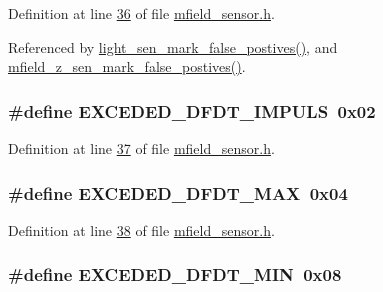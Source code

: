 Definition at line \hyperlink{a00019_source_l00036}{36} of file \hyperlink{a00019_source}{mfield\+\_\+sensor.\+h}.



Referenced by \hyperlink{a00047_source_l00491}{light\+\_\+sen\+\_\+mark\+\_\+false\+\_\+postives()}, and \hyperlink{a00053_source_l00747}{mfield\+\_\+z\+\_\+sen\+\_\+mark\+\_\+false\+\_\+postives()}.

\hypertarget{a00019_abf943c473e214930a7be647c4c43b55d}{
\subsubsection[{E\+X\+C\+E\+D\+E\+D\+\_\+\+D\+F\+D\+T\+\_\+\+I\+M\+P\+U\+L\+S}]{\setlength{\rightskip}{0pt plus 5cm}\#define E\+X\+C\+E\+D\+E\+D\+\_\+\+D\+F\+D\+T\+\_\+\+I\+M\+P\+U\+L\+S~0x02}}\label{a00019_abf943c473e214930a7be647c4c43b55d}


Definition at line \hyperlink{a00019_source_l00037}{37} of file \hyperlink{a00019_source}{mfield\+\_\+sensor.\+h}.

\hypertarget{a00019_afe7d875f6e5291e2b91df5c18af8789f}{
\subsubsection[{E\+X\+C\+E\+D\+E\+D\+\_\+\+D\+F\+D\+T\+\_\+\+M\+A\+X}]{\setlength{\rightskip}{0pt plus 5cm}\#define E\+X\+C\+E\+D\+E\+D\+\_\+\+D\+F\+D\+T\+\_\+\+M\+A\+X~0x04}}\label{a00019_afe7d875f6e5291e2b91df5c18af8789f}


Definition at line \hyperlink{a00019_source_l00038}{38} of file \hyperlink{a00019_source}{mfield\+\_\+sensor.\+h}.

\hypertarget{a00019_a7bccfba89f8c2aedefd2d67e2a1c475e}{
\subsubsection[{E\+X\+C\+E\+D\+E\+D\+\_\+\+D\+F\+D\+T\+\_\+\+M\+I\+N}]{\setlength{\rightskip}{0pt plus 5cm}\#define E\+X\+C\+E\+D\+E\+D\+\_\+\+D\+F\+D\+T\+\_\+\+M\+I\+N~0x08}}\label{a00019_a7bccfba89f8c2aedefd2d67e2a1c475e}


